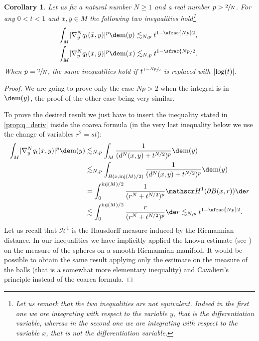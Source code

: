 \documentclass[10pt]{amsart}
\theoremstyle{plain}
\newtheorem{corollary}[corollary]{Corollary}
\theoremstyle{definition}
\numberwithin{equation}{section}
\newcommand{\Haus}{\ensuremath{\mathscr H}}
\renewcommand{\comma}{\ensuremath{\text{, }}}
\newcommand{\comma}{\ensuremath{\text{, }}}
\newcommand{\fullstop}{\ensuremath{\text{. }}}
\newcommand{\m}{\ensuremath{\mathrm m}}
\DeclareMathOperator{\injradius}{inj}
\DeclarePairedDelimiter\abs{\lvert}{\rvert}
\begin{document}
\begin{corollary}\label{cor:q_four}
Let us fix a natural number $N\ge 1$ and a real number $p > \sfrac2N$.
For any $0<t<1$ and $\bar x,\bar y\in M$ the following two inequalities hold\footnote{Let us remark that the
two inequalities are not equivalent. Indeed in the first one we are integrating with respect to the variable $y$, that
is the differentiation variable, whereas in the second one we are integrating with respect to the variable $x$, that
\emph{is not} the differentiation variable.}
\begin{align*}
&\int_M\abs{\nabla^N_y q_t(\bar x,y)}^p\de\m(y) \lesssim_{N,p} t^{1-\sfrac{Np}2}\comma \\
&\int_M\abs{\nabla^N_y q_t(x,\bar y)}^p\de\m(x) \lesssim_{N,p} t^{1-\sfrac{Np}2}\fullstop
\end{align*}
When $p=\sfrac2N$, the same inequalities hold if $t^{1-\sfrac{Np}2}$ is replaced with $\abs{\log(t)}$.
\end{corollary}
\begin{proof}
We are going to prove only the case $Np>2$ when the integral is in $\de\m(y)$, the proof of
the other case being very similar.

To prove the desired result we just have to insert the inequality stated in \cref{prop:q_deriv}
inside the coarea formula (in the very last inequality below we use the change of variables
$r^2=st$):
\begin{align*}
\int_M\abs{\nabla^N_y q_t(x,y)}^p\de\m(y)
&\lesssim_{N,p} \int_M\frac{1}{(d^N(x,y)+t^{N/2})^p}\de\m(y) \\
&\lesssim_{N,p} \int_{B(x,\injradius(M)/2)} \frac{1}{(d^N(x,y)+t^{N/2})^p}\de\m(y) \\
&= \int_0^{\injradius(M)/2}\frac{1}{(r^N+t^{N/2})^p}\Haus^1(\partial B(x, r))\de r \\
&\lesssim \int_0^{\injradius(M)/2}\frac{r}{(r^N+t^{N/2})^p}\de r
\lesssim_{N,p} t^{1-\sfrac{Np}2} \fullstop
\end{align*}
Let us recall that $\Haus^1$ is the Hausdorff measure induced by the Riemannian distance.
In our inequalities we have implicitly applied the known estimate (see \cite{Petersen98})
on the measure of the spheres on a smooth Riemannian manifold. It would be possible to obtain
the same result applying only the estimate on the measure of the balls (that is a somewhat
more elementary inequality) and Cavalieri's principle instead of the coarea formula.
\end{proof}
\end{document}
